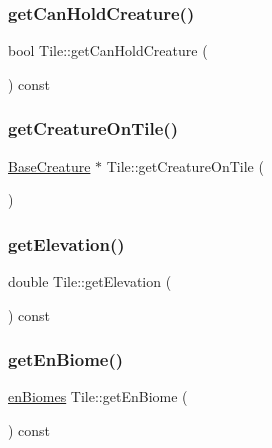 \subsubsection{\texorpdfstring{get\+Can\+Hold\+Creature()}{getCanHoldCreature()}}
{\footnotesize\ttfamily bool Tile\+::get\+Can\+Hold\+Creature (\begin{DoxyParamCaption}{ }\end{DoxyParamCaption}) const}

\mbox{\label{class_tile_a54ef2c2caca417c3352c721371c0e54f}} 
\subsubsection{\texorpdfstring{get\+Creature\+On\+Tile()}{getCreatureOnTile()}}
{\footnotesize\ttfamily \mbox{\hyperlink{class_base_creature}{Base\+Creature}} $\ast$ Tile\+::get\+Creature\+On\+Tile (\begin{DoxyParamCaption}{ }\end{DoxyParamCaption})}

\mbox{\label{class_tile_ae55f1f904e96c3acc966d007f52b5b4f}} 
\subsubsection{\texorpdfstring{get\+Elevation()}{getElevation()}}
{\footnotesize\ttfamily double Tile\+::get\+Elevation (\begin{DoxyParamCaption}{ }\end{DoxyParamCaption}) const}

\mbox{\label{class_tile_ad222bb34de7a88d904df0e92709d9b75}} 
\subsubsection{\texorpdfstring{get\+En\+Biome()}{getEnBiome()}}
{\footnotesize\ttfamily \mbox{\hyperlink{_enum_types_8hpp_a5c2255009cd01c90cf68245e6f453d1c}{en\+Biomes}} Tile\+::get\+En\+Biome (\begin{DoxyParamCaption}{ }\end{DoxyParamCaption}) const}

